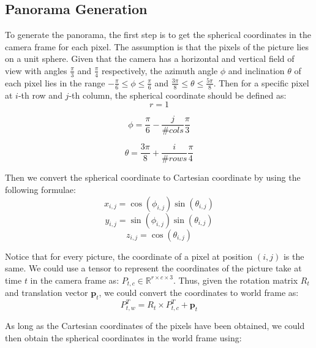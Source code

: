 \documentclass[conference]{IEEEtran}
\begin{document}
\subsection{Panorama Generation}
To generate the panorama, the first step is to get the spherical coordinates in the camera frame for each pixel. The assumption
is that the pixels of the picture lies on a unit sphere. Given that the camera has a horizontal and vertical field of view with
angles $\frac{\pi}{3}$ and $\frac{\pi}{4}$ respectively, the azimuth angle $\phi$ and inclination $\theta$ of each pixel lies in
the range $-\frac{\pi}{6} \leq \phi \leq \frac{\pi}{6}$ and $\frac{3\pi}{8} \leq \theta \leq \frac{5\pi}{8}$. Then for a specific
pixel at $i$-th row and $j$-th column, the spherical coordinate should be defined as:
\begin{equation}
    r = 1
\end{equation}

\begin{equation}
    \phi = \frac{\pi}{6} - \frac{j}{\#cols} \frac{\pi}{3}
\end{equation}

\begin{equation}
    \theta = \frac{3\pi}{8} + \frac{i}{\#rows} \frac{\pi}{4}
\end{equation}

Then we convert the spherical coordinate to Cartesian coordinate by using the following formulae:
\begin{equation}
    x_{i, j} = \cos(\phi_{i, j})\sin(\theta_{i, j})
\end{equation}
\begin{equation}
    y_{i, j} = \sin(\phi_{i, j})\sin(\theta_{i, j})
\end{equation}
\begin{equation}
    z_{i, j} = \cos(\theta_{i, j})
\end{equation}

Notice that for every picture, the coordinate of a pixel at position $(i, j)$ is the same. We could
use a tensor to represent the coordinates of the picture take at time $t$ in the camera frame as:
$P_{t, c} \in \mathbb{R}^{r \times c \times 3}$.
Thus, given the rotation matrix $R_t$ and translation vector $\boldsymbol{p}_t$, we could convert the coordinates to
world frame as:
\begin{equation}
    P_{t, w}^T = R_t \times P_{t, c}^T + \boldsymbol{p}_t
\end{equation}

As long as the Cartesian coordinates of the pixels have been obtained, we could then obtain the spherical
coordinates in the world frame using:
\end{document}
